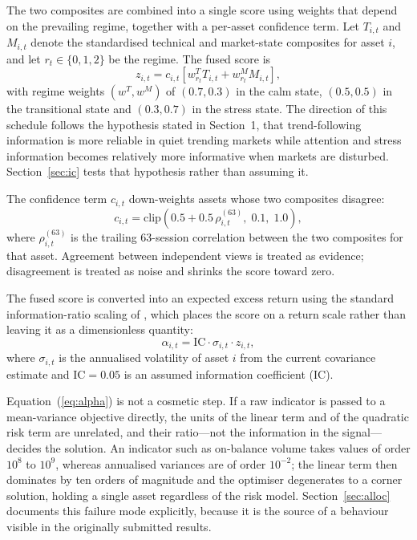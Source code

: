 The two composites are combined into a single score using weights that depend on the
prevailing regime, together with a per-asset confidence term. Let $T_{i,t}$ and
$M_{i,t}$ denote the standardised technical and market-state composites for asset $i$,
and let $r_t \in \{0,1,2\}$ be the regime. The fused score is
\begin{equation}
z_{i,t} = c_{i,t} \left[ w^{T}_{r_t} T_{i,t} + w^{M}_{r_t} M_{i,t} \right],
\end{equation}
with regime weights $(w^T, w^M)$ of $(0.7, 0.3)$ in the calm state, $(0.5, 0.5)$ in the
transitional state and $(0.3, 0.7)$ in the stress state. The direction of this schedule
follows the hypothesis stated in Section~1, that trend-following information is more
reliable in quiet trending markets while attention and stress information becomes
relatively more informative when markets are disturbed. Section~\ref{sec:ic} tests that
hypothesis rather than assuming it.

The confidence term $c_{i,t}$ down-weights assets whose two composites disagree:
\begin{equation}
c_{i,t} = \mathrm{clip}\!\left(0.5 + 0.5\,\rho^{(63)}_{i,t}, \; 0.1, \; 1.0\right),
\end{equation}
where $\rho^{(63)}_{i,t}$ is the trailing 63-session correlation between the two
composites for that asset. Agreement between independent views is treated as evidence;
disagreement is treated as noise and shrinks the score toward zero.

The fused score is converted into an expected excess return using the standard
information-ratio scaling of \citet{grinold00}, which places the score on a return
scale rather than leaving it as a dimensionless quantity:
\begin{equation}
\alpha_{i,t} = \mathrm{IC} \cdot \sigma_{i,t} \cdot z_{i,t},
\label{eq:alpha}
\end{equation}
where $\sigma_{i,t}$ is the annualised volatility of asset $i$ from the current
covariance estimate and $\mathrm{IC} = 0.05$ is an assumed information coefficient (IC).

Equation~(\ref{eq:alpha}) is not a cosmetic step. If a raw indicator is passed to a
mean-variance objective directly, the units of the linear term and of the quadratic
risk term are unrelated, and their ratio---not the information in the signal---decides
the solution. An indicator such as on-balance volume takes values of order $10^{8}$ to
$10^{9}$, whereas annualised variances are of order $10^{-2}$; the linear term then
dominates by ten orders of magnitude and the optimiser degenerates to a corner
solution, holding a single asset regardless of the risk model. Section~\ref{sec:alloc}
documents this failure mode explicitly, because it is the source of a behaviour visible
in the originally submitted results.

